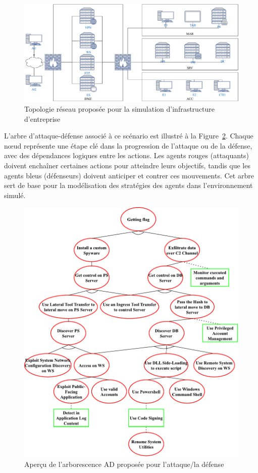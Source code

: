 \begin{figure}[h!]
  \centering
  \includegraphics[width=\linewidth]{figures/topology.pdf}
  \caption{Topologie réseau proposée pour la simulation d’infrastructure d’entreprise}
  \label{fig:scenario_network_topology}
\end{figure}

L'arbre d'attaque-défense associé à ce scénario est illustré à la Figure~\ref{fig:ADTree}. Chaque nœud représente une étape clé dans la progression de l'attaque ou de la défense, avec des dépendances logiques entre les actions. Les agents rouges (attaquants) doivent enchaîner certaines actions pour atteindre leurs objectifs, tandis que les agents bleus (défenseurs) doivent anticiper et contrer ces mouvements. Cet arbre sert de base pour la modélisation des stratégies des agents dans l'environnement simulé.

\begin{figure}[h!]
  \centering
  \includegraphics[width=0.8\linewidth]{figures/ADTree.pdf}
  \caption{Aperçu de l'arborescence AD proposée pour l'attaque/la défense}
  \label{fig:ADTree}
\end{figure}


